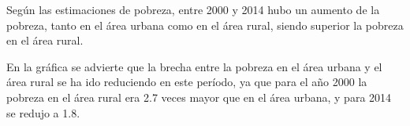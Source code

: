 Según las estimaciones de pobreza, entre 2000 y 2014 hubo un aumento de la pobreza, tanto en el área urbana como en el área rural, siendo superior la pobreza en el área rural. 

 En la gráfica se advierte que la brecha entre la pobreza en el área urbana y el área rural se ha ido reduciendo en este período, ya que para el año 2000 la pobreza en el área rural era 2.7 veces mayor que en el área urbana, y para 2014 se redujo a 1.8. 